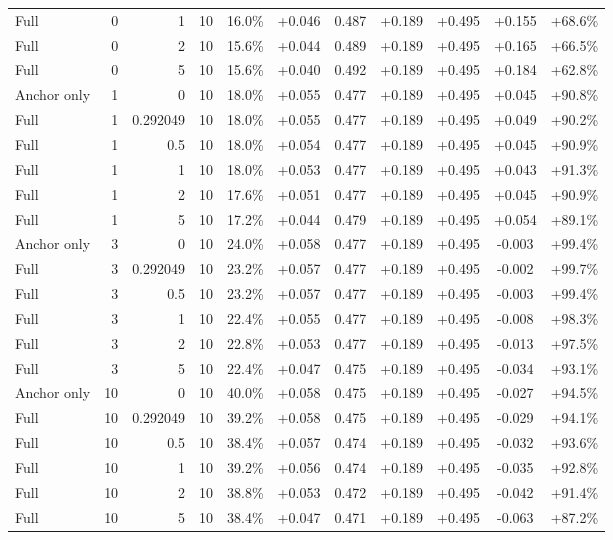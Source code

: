 \begin{table}[htbp]
\begin{tabular}{lrrrccccccc}
Full & 0 & 1 & 10 & 16.0\% & +0.046 & 0.487 & +0.189 & +0.495 & +0.155 & +68.6\% \\
Full & 0 & 2 & 10 & 15.6\% & +0.044 & 0.489 & +0.189 & +0.495 & +0.165 & +66.5\% \\
Full & 0 & 5 & 10 & 15.6\% & +0.040 & 0.492 & +0.189 & +0.495 & +0.184 & +62.8\% \\
Anchor only & 1 & 0 & 10 & 18.0\% & +0.055 & 0.477 & +0.189 & +0.495 & +0.045 & +90.8\% \\
Full & 1 & 0.292049 & 10 & 18.0\% & +0.055 & 0.477 & +0.189 & +0.495 & +0.049 & +90.2\% \\
Full & 1 & 0.5 & 10 & 18.0\% & +0.054 & 0.477 & +0.189 & +0.495 & +0.045 & +90.9\% \\
Full & 1 & 1 & 10 & 18.0\% & +0.053 & 0.477 & +0.189 & +0.495 & +0.043 & +91.3\% \\
Full & 1 & 2 & 10 & 17.6\% & +0.051 & 0.477 & +0.189 & +0.495 & +0.045 & +90.9\% \\
Full & 1 & 5 & 10 & 17.2\% & +0.044 & 0.479 & +0.189 & +0.495 & +0.054 & +89.1\% \\
Anchor only & 3 & 0 & 10 & 24.0\% & +0.058 & 0.477 & +0.189 & +0.495 & -0.003 & +99.4\% \\
Full & 3 & 0.292049 & 10 & 23.2\% & +0.057 & 0.477 & +0.189 & +0.495 & -0.002 & +99.7\% \\
Full & 3 & 0.5 & 10 & 23.2\% & +0.057 & 0.477 & +0.189 & +0.495 & -0.003 & +99.4\% \\
Full & 3 & 1 & 10 & 22.4\% & +0.055 & 0.477 & +0.189 & +0.495 & -0.008 & +98.3\% \\
Full & 3 & 2 & 10 & 22.8\% & +0.053 & 0.477 & +0.189 & +0.495 & -0.013 & +97.5\% \\
Full & 3 & 5 & 10 & 22.4\% & +0.047 & 0.475 & +0.189 & +0.495 & -0.034 & +93.1\% \\
Anchor only & 10 & 0 & 10 & 40.0\% & +0.058 & 0.475 & +0.189 & +0.495 & -0.027 & +94.5\% \\
Full & 10 & 0.292049 & 10 & 39.2\% & +0.058 & 0.475 & +0.189 & +0.495 & -0.029 & +94.1\% \\
Full & 10 & 0.5 & 10 & 38.4\% & +0.057 & 0.474 & +0.189 & +0.495 & -0.032 & +93.6\% \\
Full & 10 & 1 & 10 & 39.2\% & +0.056 & 0.474 & +0.189 & +0.495 & -0.035 & +92.8\% \\
Full & 10 & 2 & 10 & 38.8\% & +0.053 & 0.472 & +0.189 & +0.495 & -0.042 & +91.4\% \\
Full & 10 & 5 & 10 & 38.4\% & +0.047 & 0.471 & +0.189 & +0.495 & -0.063 & +87.2\% \\

\end{tabular}
\end{table}
